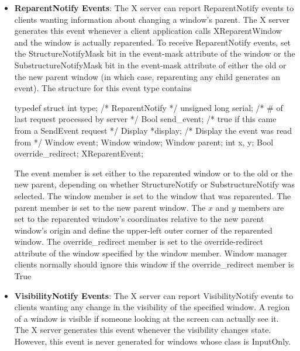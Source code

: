 \documentclass{report}
\begin{document}
\begin{itemize}
            \bigbreak \noindent 
            To update the client application’s knowledge of the keyboard, you should call XRefreshKeyboardMapping
        \item \textbf{ReparentNotify Events}: The X server can report ReparentNotify events to clients wanting information about changing a window’s parent. The X server generates this event whenever a client application calls XReparentWindow and the window is actually reparented.
            \bigbreak \noindent 
            To receive ReparentNotify events, set the StructureNotifyMask bit in the event-mask attribute of the window or the SubstructureNotifyMask bit in the event-mask attribute of either the old or the new parent window (in which case, reparenting any child generates an event).
            \bigbreak \noindent 
            The structure for this event type contains
            \bigbreak \noindent 
            \begin{cppcode}
                typedef struct {
                    int type;               /* ReparentNotify */
                    unsigned long serial;   /* # of last request processed by server */
                    Bool send_event;        /* true if this came from a SendEvent request */
                    Display *display;       /* Display the event was read from */
                    Window event;
                    Window window;
                    Window parent;
                    int x, y;
                    Bool override_redirect;
                } XReparentEvent;
            \end{cppcode}
            \bigbreak \noindent 
            The event member is set either to the reparented window or to the old or the new parent, depending on whether StructureNotify or SubstructureNotify was selected. The window member is set to the window that was reparented. The parent member is set to the new parent window. The $x$ and $y$ members are set to the reparented window’s coordinates relative to the new parent window’s origin and define the upper-left outer corner of the reparented window. The override\_redirect member is set to the override-redirect attribute of the window specified by the window member. Window manager clients normally should ignore this window if the override\_redirect member is True
        \item \textbf{VisibilityNotify Events}: The X server can report VisibilityNotify events to clients wanting any change in the visibility of the specified window. A region of a window is visible if someone looking at the screen can actually see it. The X server generates this event whenever the visibility changes state. However, this event is never generated for windows whose class is InputOnly.

\end{itemize}
\end{document}
